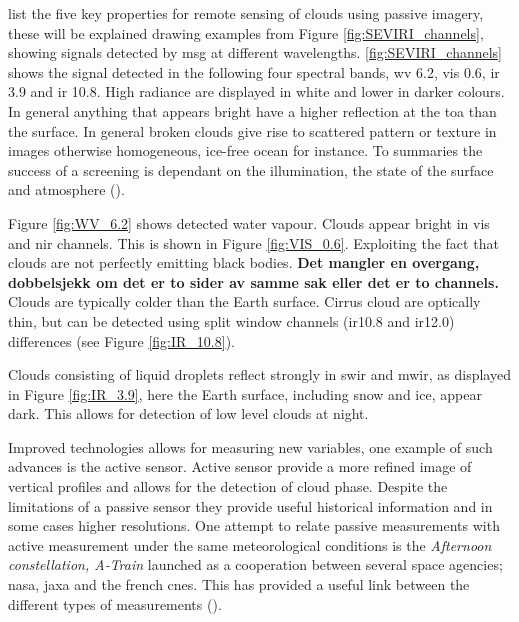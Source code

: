  list the five key properties for remote sensing of clouds using passive imagery, these will be explained drawing examples from Figure \ref{fig:SEVIRI_channels}, showing signals detected by \acrshort{msg} at different wavelengths. \ref{fig:SEVIRI_channels} shows the signal detected in the following four spectral bands, \acrshort{wv} 6.2, \acrshort{vis} 0.6, \acrshort{ir} 3.9 and \acrshort{ir} 10.8. High radiance are displayed in white and lower in darker colours. In general anything that appears bright have a higher reflection at the \acrshort{toa} than the surface.  In general broken clouds give rise to scattered pattern or texture in images otherwise homogeneous, ice-free ocean for instance. To summaries the success of a screening is dependant on the illumination, the state of the surface and atmosphere (\cite{Karlsson2015AdvancingData}).  

Figure \ref{fig:WV_6.2} shows detected water vapour. Clouds appear bright in \acrfull{vis} and \acrfull{nir} channels. This is shown in Figure \ref{fig:VIS_0.6}. Exploiting the fact that clouds are not perfectly emitting black bodies. \textbf{Det mangler en overgang, dobbelsjekk om det er to sider av samme sak eller det er to channels.} Clouds are typically colder than the Earth surface. Cirrus cloud are optically thin, but can be detected using split window channels (\acrshort{ir}10.8 and \acrshort{ir}12.0) differences (see Figure \ref{fig:IR_10.8}). 

Clouds consisting of liquid droplets reflect strongly in \acrfull{swir} and \acrfull{mwir}, as displayed in Figure \ref{fig:IR_3.9}, here the Earth surface, including snow and ice, appear dark. This allows for detection of low level clouds at night. 

Improved technologies allows for measuring new variables, one example of such advances is the active sensor. Active sensor provide a more refined image of vertical profiles and allows for the detection of cloud phase. Despite the limitations of a passive sensor they provide useful historical information and in some cases higher resolutions. One attempt to relate passive measurements with active measurement under the same meteorological conditions is the \textit{Afternoon constellation, A-Train} launched as a cooperation between several space agencies; \acrfull{nasa}, \acrlong{jaxa} and the french \acrfull{cnes}. This has provided a useful link between the different types of measurements (\cite{Stephens2018CloudsatSystem}). 

